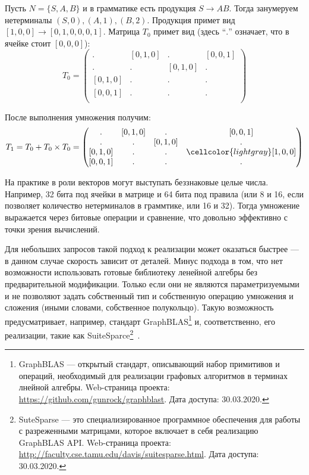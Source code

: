 \begin{example}
Пусть $N = \{S, A, B\}$ и в грамматике есть продукция $S \to A B$. Тогда занумеруем нетерминалы $ (S, 0), (A, 1), (B, 2)$. Продукция примет вид $[1, 0, 0] \to [0, 1, 0, 0, 0, 1]$. Матрица $T_0$ примет вид (здесь ``$.$'' означает, что в ячейке стоит $[0,0,0]$):
\[
T_0 = \begin{pmatrix}
. & [0,1,0]       & . & [0,0,1]       \\
. & . & [0,1,0]       & . \\
[0,1,0]       & . & . & . \\
[0,0,1]      & . & . & . \\
\end{pmatrix}
\]

После выполнения умножения получим:
\[
T_1 = T_0 + T_0 \times T_0 =
\begin{pmatrix}
. & [0,1,0]       & . & [0,0,1]       \\
. & . & [0,1,0]       & . \\
[0,1,0]       & . & . & \cellcolor{lightgray}[1,0,0] \\
[0,0,1]      & . & . & . \\
\end{pmatrix}
\]
\end{example}


На практике в роли векторов могут выступать беззнаковые целые числа. 
Например, 32 бита под ячейки в матрице и 64 бита под правила (или 8 и 16, если позволяет количество нетерминалов в граммтике, или 16 и 32).
Тогда умножение выражается через битовые операции и сравнение, что довольно эффективно с точки зрения вычислений.

Для небольших запросов такой подход к реализации может оказаться быстрее --- в данном случае скорость зависит от деталей. Минус подхода в том, что нет возможности использовать готовые библиотеку ленейной алгебры без предварительной модификации. Только если они не являются параметризуемыми и не позволяют задать собственный тип и собственную операцию умножения и сложения (иными словами, собственное полукольцо). Такую возможность предусматривает, например, стандарт GraphBLAS\footnote{GraphBLAS --- открытый стандарт, описывающий набор примитивов и операций, необходимый для реализации графовых алгоритмов в терминах лнейной алгебры. Web-страница проекта: \url{https://github.com/gunrock/graphblast}. Дата доступа: 30.03.2020.} и, соответственно, его реализации, такие как SuiteSparce\footnote{SuteSparse --- это специализированное программное обеспечения для работы с разреженными матрицами, которое включает в себя реализацию GraphBLAS API. Web-страница проекта: \url{http://faculty.cse.tamu.edu/davis/suitesparse.html}. Дата доступа: 30.03.2020.}~\cite{Davis2018Algorithm9S}.

